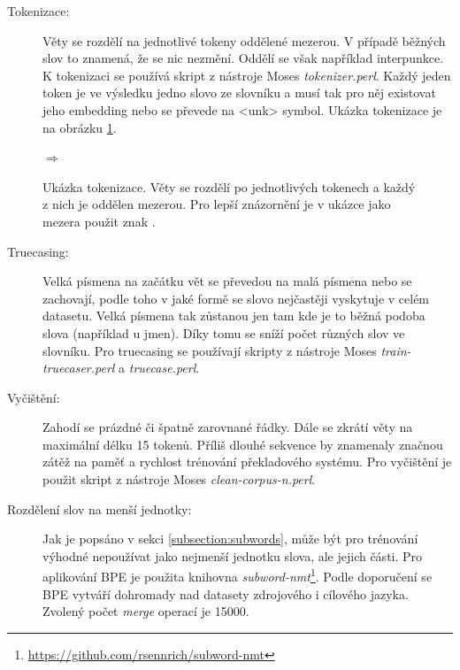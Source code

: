 \begin{description}
  \item[Tokenizace:] Věty se rozdělí na jednotlivé tokeny oddělené mezerou. V případě běžných slov to znamená, že se nic nezmění. Oddělí se však například interpunkce. K tokenizaci se používá skript z nástroje Moses \emph{tokenizer.perl}. Každý jeden token je ve výsledku jedno slovo ze slovníku a musí tak pro něj existovat jeho embedding nebo se převede na <unk> symbol. Ukázka tokenizace je na obrázku \ref{img:tokenization}.
\end{description}

\begin{figure}[H]
    \begin{center}
     \setlength{\fboxsep}{8pt}
        $\Longrightarrow$
        \setlength{\fboxsep}{8pt}
    \end{center}
	\caption{Ukázka tokenizace. Věty se rozdělí po jednotlivých tokenech a každý z nich je oddělen mezerou. Pro lepší znázornění je v ukázce jako mezera použit znak \uv{\textvisiblespace}.}
	\label{img:tokenization}
\end{figure}


\begin{description}
  \item[Truecasing:] Velká písmena na začátku vět se převedou na malá písmena nebo se zachovají, podle toho v jaké formě se slovo nejčastěji vyskytuje v celém datasetu. Velká písmena tak zůstanou jen tam kde je to běžná podoba slova (například u jmen). Díky tomu se sníží počet různých slov ve slovníku. Pro truecasing se používají skripty z nástroje Moses \emph{train-truecaser.perl} a \emph{truecase.perl}.
\end{description}

\begin{description}
  \item[Vyčištění:] Zahodí se prázdné či špatně zarovnané řádky. Dále se zkrátí věty na maximální délku 15 tokenů. Příliš dlouhé sekvence by znamenaly značnou zátěž na paměť a rychlost trénování překladového systému. Pro vyčištění je použit skript z nástroje Moses \emph{clean-corpus-n.perl}.
\end{description}

\begin{description}
  \item[Rozdělení slov na menší jednotky:]\label{description:bpeApplication} Jak je popsáno v sekci \ref{subsection:subwords}, může být pro trénování výhodné nepoužívat jako nejmenší jednotku slova, ale jejich části. Pro aplikování BPE je použita knihovna \emph{subword-nmt}\footnote{\url{https://github.com/rsennrich/subword-nmt}}. Podle doporučení se BPE vytváří dohromady nad datasety zdrojového i cílového jazyka. Zvolený počet \emph{merge} operací je 15000.
\end{description}


